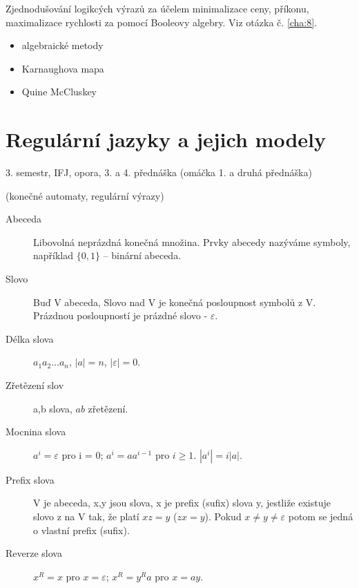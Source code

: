 \documentclass[a4paper, 11pt]{report}
\begin{document}
Zjednodušování logikcých výrazů za účelem minimalizace ceny, příkonu, maximalizace rychlosti za pomocí Booleovy algebry. Viz otázka č. \ref{cha:8}.
\begin{itemize}
	\item algebraické metody
	\item Karnaughova mapa
	\item Quine McCluskey
\end{itemize}






















\chapter{Regulární jazyky a jejich modely} \label{cha:20}

3. semestr, IFJ, opora, 3. a 4. přednáška (omáčka 1. a druhá přednáška)

(konečné automaty, regulární výrazy)

\begin{description}
	\item[Abeceda] Libovolná neprázdná konečná množina. Prvky abecedy nazýváme symboly, například $\{0, 1\}$ -- binární abeceda.
	\item[Slovo] Buď V abeceda, Slovo nad V je konečná posloupnost symbolů z V. Prázdnou posloupností je prázdné slovo - $\varepsilon$.
	\item[Délka slova] $a_1 a_2 \dots a_n$, $|a| = n$, $|\varepsilon| = 0$.
	\item[Zřetězení slov] a,b slova, $ab$ zřetězení.
	\item[Mocnina slova] $a^i = \varepsilon$ pro i = 0; $a^i = a a^{i-1}$ pro $i \geq 1$. $|a^i| = i |a|$.
	\item[Prefix slova] V je abeceda, x,y jsou slova, x je prefix (sufix) slova y, jestliže existuje slovo z na V tak, že platí $xz = y$ ($zx = y$). Pokud $x \neq y \neq \varepsilon$ potom se jedná o vlastní prefix (sufix).
	\item[Reverze slova] $x^R = x$ pro $x = \varepsilon$; $x^R = y^Ra$ pro $x = ay$.
\end{description}
\end{document}
